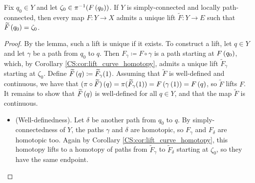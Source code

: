 \documentclass[../Moduli_Spaces_of_Riemann_Surfaces.tex]{subfiles}
\begin{document}
    \begin{proposition}\label{CS:prp:lift_maps}
        Fix $q_0\in Y$ and let $\zeta_0\in\pi^{-1}\!\left(F\left(q_0\right)\right)$. If $Y$ is simply-connected and locally path-connected, then every map $F:Y\to X$ admits a unique lift $\widetilde{F}:Y\to E$ such that $\widetilde{F}\left(q_0\right)=\zeta_0$.
    \end{proposition}
    \begin{proof}
        By the lemma, such a lift is unique if it exists. To construct a lift, let $q\in Y$ and let $\gamma$ be a path from $q_0$ to $q$. Then $F_\gamma\coloneqq F\circ\gamma$ is a path starting at $F\left(q_0\right)$, which, by Corollary \ref{CS:cor:lift_curve_homotopy}, admits a unique lift $\widetilde{F}_\gamma$ starting at $\zeta_0$. Define $\widetilde{F}\left(q\right)\coloneqq\widetilde{F}_\gamma\!\left(1\right)$. Assuming that $\widetilde{F}$ is well-defined and continuous, we have that $(\pi\circ\widetilde{F})\left(q\right)=\pi(\widetilde{F}_\gamma\!\left(1\right))=F\left(\gamma\left(1\right)\right)=F\left(q\right)$, so $\widetilde{F}$ lifts $F$. It remains to show that $\widetilde{F}\left(q\right)$ is well-defined for all $q\in Y$, and that the map $\widetilde{F}$ is continuous.
        \begin{itemize}
            \item (Well-definedness). Let $\delta$ be another path from $q_0$ to $q$. By simply-connectedness of $Y$, the paths $\gamma$ and $\delta$ are homotopic, so $F_\gamma$ and $F_\delta$ are homotopic too. Again by Corollary \ref{CS:cor:lift_curve_homotopy}, this homotopy lifts to a homotopy of paths from $\widetilde{F}_\gamma$ to $\widetilde{F}_\delta$ starting at $\zeta_0$, so they have the same endpoint.
                \vspace{-0.2in}
                \begin{center}
\end{center}
\end{itemize}
\end{proof}
\end{document}

